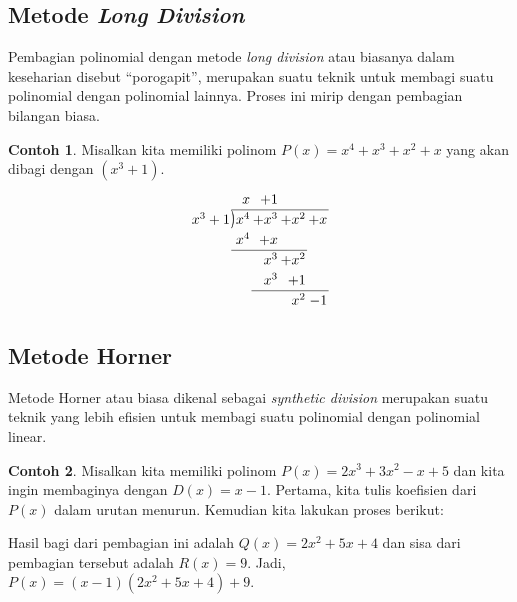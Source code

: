 \documentclass[aspectratio=169]{beamer}
\theoremstyle{definition}
\newtheorem{contoh}{Contoh}
\newcommand{\longdiv}{\smash{\mkern-0.43mu\vstretch{1.31}{\hstretch{.7}{)}}\mkern-5.2mu\vstretch{1.31}{\hstretch{.7}{)}}}}
\begin{document}
\subsection{Metode \textit{Long Division}}
\begin{frame}{\insertsection}{\insertsubsection}
  Pembagian polinomial dengan metode \textit{long division} atau biasanya dalam keseharian disebut ``porogapit'', merupakan suatu teknik untuk membagi suatu polinomial dengan polinomial lainnya. Proses ini mirip dengan pembagian bilangan biasa.
  \begin{contoh}
    Misalkan kita memiliki polinom $P(x) = x^4+x^3+x^2+x$ yang akan dibagi dengan $(x^3 + 1)$.
    \[
      \arraycolsep=1pt
      \renewcommand\arraystretch{1.2}
      \begin{array}{*1r @{\hskip\arraycolsep}c@{\hskip\arraycolsep} *{11}r}
              &          & x   & +1    &             \\
        \cline{2-6}
        x^3+1 & \longdiv & x^4 & + x^3 & + x^2 & +x  \\
              &          & x^4 & + x                 \\
        \cline{2-5}
              &          &     & x^3   & + x^2       \\
              &          &     & x^3   & +1          \\
        \cline{4-6}
              &          &     &       & x^2   & - 1 \\
      \end{array}\]
  \end{contoh}
\end{frame}
\subsection{Metode Horner}
\begin{frame}{\insertsection}{\insertsubsection}
  Metode Horner atau biasa dikenal sebagai \textit{synthetic division} merupakan suatu teknik yang lebih efisien untuk membagi suatu polinomial dengan polinomial linear.
  \begin{contoh}
    Misalkan kita memiliki polinom $P(x) = 2x^3 + 3x^2 - x + 5$ dan kita ingin membaginya dengan $D(x) = x - 1$.
    Pertama, kita tulis koefisien dari $P(x)$ dalam urutan menurun. Kemudian kita lakukan proses berikut:
    \begin{center}
    \end{center}
    Hasil bagi dari pembagian ini adalah $Q(x) = 2x^2 + 5x + 4$ dan sisa dari pembagian tersebut adalah $R(x) = 9$. Jadi, $P(x) = (x - 1)(2x^2 + 5x + 4) + 9.$
  \end{contoh}
\end{frame}
\end{document}
